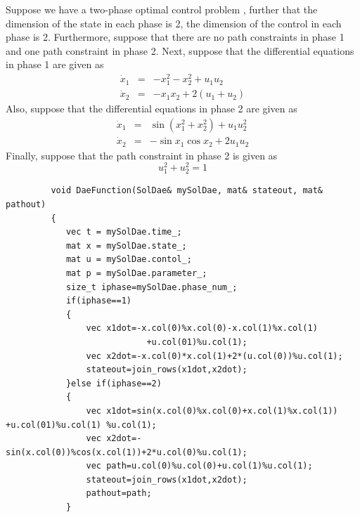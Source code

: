 \documentclass[10pt]{article}
\begin{document}
\begin{itemize}
\begin{frame}
		 	Suppose we have a two-phase optimal control problem , further that the dimension
		 	of the state in each phase is 2, the dimension of the control in each
		 	phase is 2.  Furthermore, suppose that there are no path constraints
		 	in phase 1 and one path constraint in phase 2.  Next, suppose that
		 	the differential equations in phase 1 are given as
		 	\begin{displaymath}
		 	\begin{array}{lcl}
		 	\dot {x}_1 & = & -x_1^2-x_2^2 + u_1 u_2 \\
		 	\dot {x}_2 & = & -x_1x_2 + 2(u_1+u_2)
		 	\end{array}
		 	\end{displaymath}
		 	Also, suppose that the differential equations in phase 2 are given as
		 	\begin{displaymath}
		 	\begin{array}{lcl}
		 	\dot{x}_1 & = & \sin(x_1^2+x_2^2) + u_1 u_2^2 \\
		 	\dot {x}_2 & = & -\sin x_1 \cos x_2 + 2u_1u_2
		 	\end{array}
		 	\end{displaymath}
		 	Finally, suppose that the path constraint in phase 2 is given as
		 	\begin{displaymath}
		 	u_1^2+u_2^2 = 1
		 	\end{displaymath}
		 	\begin{lstlisting}
		 void DaeFunction(SolDae& mySolDae, mat& stateout, mat& pathout)
		 {
		 	vec t = mySolDae.time_;
		 	mat x = mySolDae.state_;
		 	mat u = mySolDae.contol_;
		 	mat p = mySolDae.parameter_;
		 	size_t iphase=mySolDae.phase_num_;
		 	if(iphase==1)
		 	{
			 	vec x1dot=-x.col(0)%x.col(0)-x.col(1)%x.col(1)
						 	+u.col(01)%u.col(1);
		 	    vec x2dot=-x.col(0)*x.col(1)+2*(u.col(0))%u.col(1);
		 	    stateout=join_rows(x1dot,x2dot);
		 	}else if(iphase==2)
		 	{
			 	vec x1dot=sin(x.col(0)%x.col(0)+x.col(1)%x.col(1))	+u.col(01)%u.col(1) %u.col(1);
			 	vec x2dot=-sin(x.col(0))%cos(x.col(1))+2*u.col(0)%u.col(1);
			 	vec path=u.col(0)%u.col(0)+u.col(1)%u.col(1);
			 	stateout=join_rows(x1dot,x2dot);
			 	pathout=path;
		 	}
		 	

\end{lstlisting}
\end{frame}
\end{itemize}
\end{document}
